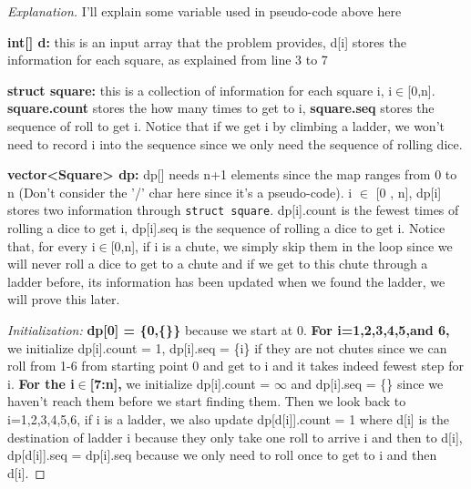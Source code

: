\documentclass[openany]{article}
\begin{document}
\begin{proof}[Explanation]{}
		\renewcommand{\qedsymbol}{} %
        I'll explain some variable used in pseudo-code above here

        \textbf{int[] d:} this is an input array that the problem provides, d[i] stores the information for each square, as explained from line 3 to 7

        \textbf{struct square:} this is a collection of information for each square i, i$\in$[0,n]. \textbf{square.count} stores the how many times to get to i, \textbf{square.seq} stores the sequence of roll to get i. Notice that if we get i by climbing a ladder, we won't need to record i into the sequence since we only need the sequence of rolling dice.
        
        \textbf{vector<Square> dp:} dp[] needs n+1 elements since the map ranges from 0 to n (Don't consider the '/' char here since it's a pseudo-code). i $\in$ [0 , n], dp[i] stores two information through \texttt{struct square}. dp[i].count is the fewest times of rolling a dice to get i, dp[i].seq is the sequence of rolling a dice to get i. Notice that, for every i$\in$[0,n], if i is a chute, we simply skip them in the loop since we will never roll a dice to get to a chute and if we get to this chute through a ladder before, its information has been updated when we found the ladder, we will prove this later.
        
        \textit{Initialization:} \textbf{dp[0] = \{0,\{\}\}} because we start at 0. \textbf{For i=1,2,3,4,5,and 6,} we initialize dp[i].count = 1, dp[i].seq = \{i\} if they are not chutes since we can roll from 1-6 from starting point 0 and get to i and it takes indeed fewest step for i. \textbf{For the i$\in$[7:n],} we initialize dp[i].count = $\infty$ and dp[i].seq = \{\} since we haven't reach them before we start finding them. Then we look back to i=1,2,3,4,5,6, if i is a ladder, we also update dp[d[i]].count = 1 where d[i] is the destination of ladder i because they only take one roll to arrive i and then to d[i], dp[d[i]].seq = dp[i].seq because we only need to roll once to get to i and then d[i].

       
\end{proof}
\end{document}
